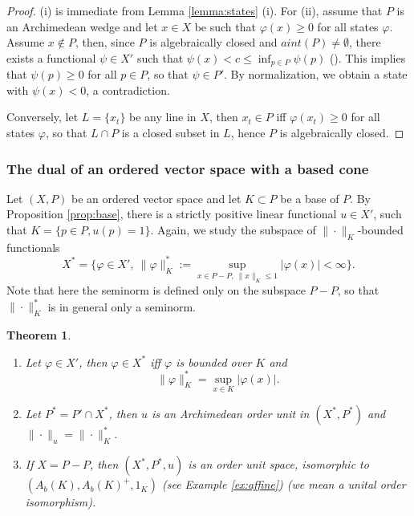 \documentclass[12pt]{article}
\newtheorem{thm}{Theorem}
\theoremstyle{remark}
\newcommand{\<}{\langle}
\begin{document}
\begin{proof} (i) is immediate from Lemma \ref{lemma:states} (i). For (ii), assume that $P$ is an Archimedean wedge and let $x\in X$ be such that $\varphi(x)\ge 0$ for all
 states $\varphi$.   Assume $x\notin P$, then, since $P$ is algebraically closed and $aint(P)\neq \emptyset$, there exists a functional $\psi\in X'$ such that 
$\psi(x)<c\le \inf_{p\in P} \psi(p)$ (\cite[17.5.(2)]{kothe}). This implies that $\psi(p)\ge 0$ for all $p\in P$, so that $\psi\in P'$. By normalization,  we obtain a state with $\psi(x)<0$, a contradiction.

 Conversely, let $L=\{x_t\}$ be any line 
in $X$, then $x_t\in P$ iff $\varphi(x_t)\ge 0$ for all states $\varphi$, so that $L\cap P$ is a closed subset in $L$, hence $P$ is algebraically closed.


\end{proof}






\subsubsection*{The dual of an ordered vector space with a based cone}


Let $(X,P)$ be an ordered vector space and let $K\subset P$ be a base of $P$. By Proposition \ref{prop:base}, there is a strictly positive linear functional $u\in X'$, such that $K=\{p\in P, u(p)=1\}$. Again, we study the subspace of $\|\cdot\|_K$-bounded functionals
\[
X^*=\{\varphi\in X',\ \|\varphi\|_K^*:=\sup_{x\in P-P,\ \|x\|_K\le 1} |\varphi(x)|<\infty\}.
\] 
Note that here the seminorm is defined only on the subspace $P-P$, so that $\|\cdot\|_K^*$ is in general only a seminorm. 


\begin{thm} \label{thm:base_dual} 
\begin{enumerate}
 \item[(i)] Let $\varphi\in X'$, then $\varphi\in X^*$ iff $\varphi$ is bounded over $K$ and 
\[
\|\varphi\|_K^*=\sup_{x\in K}|\varphi(x)|.
\]
\item[(ii)] Let $P^*=P'\cap X^*$, then  $u$ is an Archimedean order unit in $(X^*,P^*)$ and $\|\cdot\|_u=\|\cdot\|_K^*$.
\item[(iii)]
If $X=P-P$, then  
$(X^*,P^*,u)$ is  an order unit space,  isomorphic to $(A_b(K),A_b(K)^+,1_K)$ (see Example \ref{ex:affine}) (we mean a unital order isomorphism).
\end{enumerate}

\end{thm}
\end{document}

